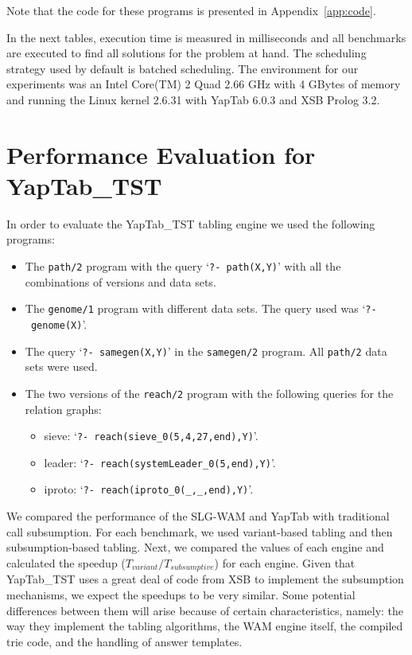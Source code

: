Note that the code for these programs is presented in Appendix~\ref{app:code}.

In the next tables, execution time is measured in milliseconds and all benchmarks
are executed to find all solutions for the problem at hand. The scheduling strategy used
by default is batched scheduling.
The environment for our experiments was an Intel Core(TM) 2 Quad 2.66 GHz with 4 GBytes of
memory and running the Linux kernel 2.6.31 with YapTab 6.0.3 and XSB Prolog 3.2.

\section{Performance Evaluation for YapTab\_TST}

In order to evaluate the YapTab\_TST tabling engine we used the following programs:

\begin{itemize}
   \item The \texttt{path/2} program with the query `\texttt{?-~path(X,Y)}' with all the combinations of
   versions and data sets.
   \item The \texttt{genome/1} program with different data sets. The query used was `\texttt{?-~genome(X)}'.
   
   \item The query `\texttt{?-~samegen(X,Y)}' in the \texttt{samegen/2} program. All \texttt{path/2} data
   sets were used.
   
   \item The two versions of the \texttt{reach/2} program with the following queries for the relation graphs:

   \begin{itemize}
      \item sieve: `\texttt{?-~reach(sieve\_0(5,4,27,end),Y)}'.
      \item leader: `\texttt{?-~reach(systemLeader\_0(5,end),Y)}'.
      \item iproto: `\texttt{?-~reach(iproto\_0(\_,\_,end),Y)}'.
   \end{itemize}

\end{itemize}

We compared the performance of the SLG-WAM and YapTab with traditional call subsumption.
For each benchmark, we used variant-based tabling and then subsumption-based tabling.
Next, we compared the values of each engine and calculated the speedup ($T_{variant} / T_{subsumptive}$) for
each engine. Given that YapTab\_TST uses a great deal of code from XSB to implement the subsumption mechanisms,
we expect the speedups to be very similar. Some potential differences between them will arise because
of certain characteristics, namely: the way they implement the tabling algorithms, the WAM engine itself,
the compiled trie code, and the handling of answer templates.

